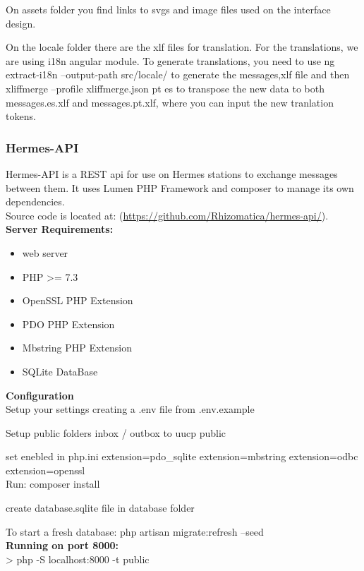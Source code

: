 \documentclass[11pt,a4paper]{article}
\begin{document}
On assets folder you find links to svgs and image files used on the interface design.

On the locale folder there are the xlf files for translation. For the translations, we are using i18n angular module. To generate translations, you need to use ng extract-i18n --output-path src/locale/ to generate the messages,xlf file and then xliffmerge --profile xliffmerge.json pt es to transpose the new data to both messages.es.xlf and messages.pt.xlf, where you can input the new tranlation tokens.

\subsubsection{Hermes-API}
Hermes-API is a REST api for use on Hermes stations to exchange messages between them.
It uses Lumen PHP Framework and composer to manage its own dependencies.\\

Source code is located at:
(\url{https://github.com/Rhizomatica/hermes-api/}).\\

\textbf{Server Requirements:}
\begin{itemize}
  \item web server
  \item PHP >= 7.3
  \item OpenSSL PHP Extension
  \item PDO PHP Extension
  \item Mbstring PHP Extension
  \item SQLite DataBase\\
\end{itemize}

\textbf{Configuration}\\
Setup your settings creating a .env file from .env.example

Setup public folders inbox / outbox to uucp public

set enebled in php.ini extension=pdo\_sqlite extension=mbstring extension=odbc extension=openssl\\

Run: composer install

create database.sqlite file in database folder

To start a fresh database: php artisan migrate:refresh --seed\\

\textbf{Running on port 8000:}\\
> php -S localhost:8000 -t public\\
\end{document}

